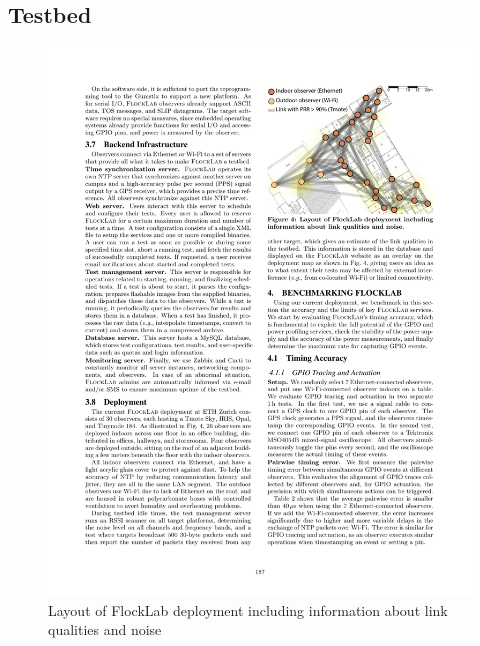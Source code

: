 
\subsection{Testbed}

\begin{figure}
\centering
\includegraphics[trim=0cm 0cm 0cm 0cm, clip=true, totalheight=0.33\textheight]
{flocklabLayout.pdf}
\caption{Layout of FlockLab deployment including information about link qualities and noise}
\label{fig_flocklab}
\end{figure}

